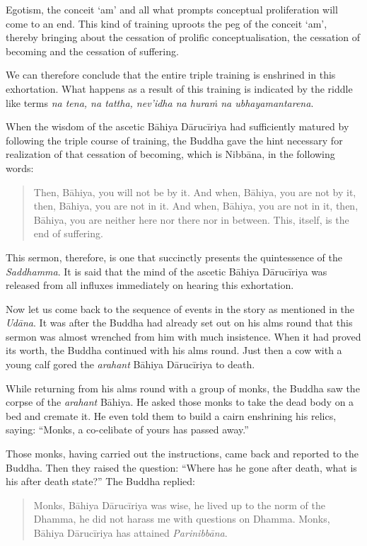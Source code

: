 Egotism, the conceit `am' and all what prompts conceptual proliferation will come to an end. This kind of training uproots the peg of the conceit `am', thereby bringing about the cessation of prolific conceptualisation, the cessation of becoming and the cessation of suffering.

We can therefore conclude that the entire triple training is enshrined in this exhortation. What happens as a result of this training is indicated by the riddle like terms \emph{na tena, na tattha, nev'idha na huraṁ na ubhayamantarena}.

When the wisdom of the ascetic Bāhiya Dārucīriya had sufficiently matured by following the triple course of training, the Buddha gave the hint necessary for realization of that cessation of becoming, which is Nibbāna, in the following words:

\begin{quote}
Then, Bāhiya, you will not be by it. And when, Bāhiya, you are not by it, then, Bāhiya, you are not in it. And when, Bāhiya, you are not in it, then, Bāhiya, you are neither here nor there nor in between. This, itself, is the end of suffering.
\end{quote}

This sermon, therefore, is one that succinctly presents the quintessence of the \emph{Saddhamma}. It is said that the mind of the ascetic Bāhiya Dārucīriya was released from all influxes immediately on hearing this exhortation.

Now let us come back to the sequence of events in the story as mentioned in the \emph{Udāna}. It was after the Buddha had already set out on his alms round that this sermon was almost wrenched from him with much insistence. When it had proved its worth, the Buddha continued with his alms round. Just then a cow with a young calf gored the \emph{arahant} Bāhiya Dārucīriya to death.

While returning from his alms round with a group of monks, the Buddha saw the corpse of the \emph{arahant} Bāhiya. He asked those monks to take the dead body on a bed and cremate it. He even told them to build a cairn enshrining his relics, saying: ``Monks, a co-celibate of yours has passed away.''

Those monks, having carried out the instructions, came back and reported to the Buddha. Then they raised the question: ``Where has he gone after death, what is his after death state?'' The Buddha replied:

\begin{quote}
Monks, Bāhiya Dārucīriya was wise, he lived up to the norm of the Dhamma, he did not harass me with questions on Dhamma. Monks, Bāhiya Dārucīriya has attained \emph{Parinibbāna}.
\end{quote}

